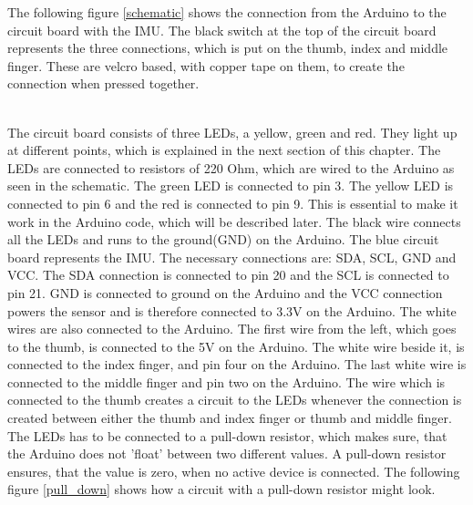 The following figure \ref{schematic} shows the connection from the Arduino to the circuit board with the IMU. The black switch at the top of the circuit board
represents the three connections, which is put on the thumb, index and middle finger. These are velcro based, with copper tape on them, to create the connection when pressed together. \\

\begin{minipage}{\linewidth}%
\label{schematic}
\end{minipage}\\

The circuit board consists of three LEDs, a yellow, green and red. They light up at different points, which is explained in the next section of this chapter.
The LEDs are connected to resistors of 220 Ohm, which are wired to the Arduino as seen in the schematic. The green LED is connected to pin 3. 
The yellow LED is connected to pin 6 and the red is connected to pin 9. This is essential to make it work in the Arduino code, which will be described later. 
The black wire connects all the LEDs and runs to the ground(GND) on the Arduino. The blue circuit board represents the IMU. The necessary connections are: SDA, SCL, GND and VCC. 
The SDA connection is connected to pin 20 and the SCL is connected to pin 21. GND is connected to ground on the Arduino and the VCC connection powers the sensor and is therefore
connected to 3.3V on the Arduino. The white wires are also connected to the Arduino. The first wire from the left, which goes to the thumb, is connected to the 5V on the Arduino. 
The white wire beside it, is connected to the index finger, and pin four on the Arduino. The last white wire is connected to the middle finger and pin two on the Arduino.
The wire which is connected to the thumb creates a circuit to the LEDs whenever the connection is created between either the thumb and index finger or thumb and middle finger. \\


The LEDs has to be connected to a pull-down resistor\citep{Pulldown_res}, which makes sure, that the Arduino does not 'float' between two different values. A pull-down resistor ensures, that the value is zero, when no active device is connected.
The following figure \ref{pull_down} shows how a circuit with a pull-down resistor might look. \\


